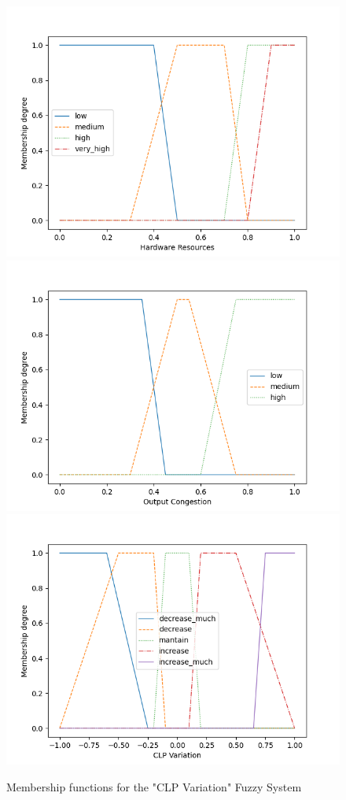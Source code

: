 \begin{figure}[!htb]
    \centering
    \hspace*{-1cm}

    \includegraphics[width=.33\textwidth]{images/plots/CpuMem.png}\hfill
    \includegraphics[width=.33\textwidth]{images/plots/OutCongestion.png}\hfill
    \includegraphics[width=.33\textwidth]{images/plots/CLP.png}

    \hspace*{-1cm}
    \caption{Membership functions for the "CLP Variation" Fuzzy System}
    \label{fig:FS_CLP_FSETS}
\end{figure}



